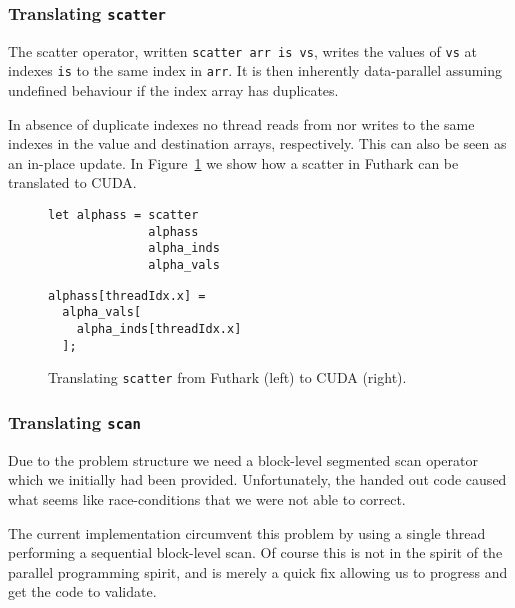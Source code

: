 \subsubsection{Translating \texttt{scatter}}

The scatter operator, written \lstinline{scatter arr is vs},
writes the values of \lstinline{vs} at indexes
\lstinline{is} to the same index in \lstinline{arr}. It is
then inherently data-parallel assuming undefined behaviour
if the index array has duplicates.

In absence of duplicate indexes no thread reads from nor
writes to the same indexes in the value and destination
arrays, respectively. This can also be seen as an in-place
update. In Figure~\ref{fig:trans_scatter} we show how a
scatter in Futhark can be translated to CUDA.
%
\begin{figure}[bt]
\begin{center}
\begin{minipage}[t]{0.45\linewidth}
\vspace{0pt}
\begin{lstlisting}
let alphass = scatter
              alphass
              alpha_inds
              alpha_vals
\end{lstlisting}
\end{minipage}
\begin{minipage}[t]{0.45\linewidth}
\vspace{0pt}
\begin{lstlisting}
alphass[threadIdx.x] =
  alpha_vals[
    alpha_inds[threadIdx.x]
  ];
\end{lstlisting}
\end{minipage}
\caption{Translating \texttt{scatter} from Futhark (left) to
  CUDA (right).}
\label{fig:trans_scatter}
\end{center}
\end{figure}


\subsubsection{Translating \texttt{scan}}

Due to the problem structure we need a block-level segmented
scan operator which we initially had been
provided. Unfortunately, the handed out code caused what
seems like race-conditions that we were not able to correct.

The current implementation circumvent this problem by using
a single thread performing a sequential block-level scan. Of
course this is not in the spirit of the parallel programming
spirit, and is merely a quick fix allowing us to progress
and get the code to validate.


